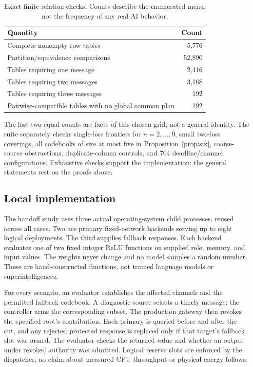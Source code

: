 \documentclass[11pt,a4paper]{article}
\theoremstyle{definition}\newtheorem{definition}{Definition}
\begin{document}
\begin{table}[t]
\centering\small
\caption{Exact finite relation checks. Counts describe the enumerated menu, not the frequency of any real AI behavior.}
\label{tab:theory}
\begin{tabular}{@{}lr@{}}\toprule
Quantity & Count\\\midrule
Complete nonempty-row tables &5,776\\
Partition/equivalence comparisons &52,890\\
Tables requiring one message &2,416\\
Tables requiring two messages &3,168\\
Tables requiring three messages &192\\
Pairwise-compatible tables with no global common plan &192\\\bottomrule
\end{tabular}
\end{table}
The last two equal counts are facts of this chosen grid, not a general identity. The suite separately checks single-loss frontiers for $n=2,\ldots,9$, small two-loss coverings, all codebooks of size at most five in Proposition~\ref{prop:six}, coarse-source obstructions, duplicate-column controls, and 704 deadline/channel configurations. Exhaustive checks support the implementation; the general statements rest on the proofs above.

\subsection{Local implementation}
The handoff study uses three actual operating-system child processes, reused across all cases. Two are primary fixed-network backends serving up to eight logical deployments. The third supplies fallback responses. Each backend evaluates one of two fixed integer ReLU functions on supplied role, memory, and input values. The weights never change and no model samples a random number. These are hand-constructed functions, not trained language models or superintelligences.

For every scenario, an evaluator establishes the affected channels and the permitted fallback codebook. A diagnostic source selects a timely message; the controller arms the corresponding subset. The production gateway then revokes the specified root's contribution. Each primary is queried before and after the cut, and any rejected protected response is replaced only if that target's fallback slot was armed. The evaluator checks the returned value and whether an output under revoked authority was admitted. Logical reserve slots are enforced by the dispatcher; no claim about measured CPU throughput or physical energy follows.
\end{document}
